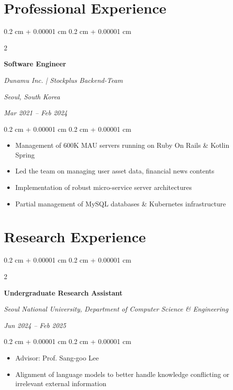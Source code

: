 \documentclass[10pt, letterpaper]{article}
\newenvironment{highlights}{
    \begin{itemize}[
        topsep=0.10 cm,
        parsep=0.10 cm,
        partopsep=0pt,
        itemsep=0pt,
        leftmargin=0.4 cm + 10pt
    ]
}{
    \end{itemize}
} %
\newenvironment{onecolentry}{
    \begin{adjustwidth}{
        0.2 cm + 0.00001 cm
    }{
        0.2 cm + 0.00001 cm
    }
}{
    \end{adjustwidth}
} %
\newenvironment{twocolentry}[2][]{
    \onecolentry
    \def\secondColumn{#2}
    \setcolumnwidth{\fill, 4.5 cm}
    \begin{paracol}{2}
}{
    \switchcolumn \raggedleft \secondColumn
    \end{paracol}
    \endonecolentry
} %
\begin{document}
    
    \section{Professional Experience}

        \begin{twocolentry}{
        \textit{Seoul, South Korea}    
            
        \textit{Mar 2021 – Feb 2024}}
            \textbf{Software Engineer}
            
            \textit{Dunamu Inc. | Stockplus Backend-Team}
        \end{twocolentry}

        \vspace{0.10 cm}
        \begin{onecolentry}
            \begin{highlights}
                \item Management of 600K MAU servers running on Ruby On Rails \& Kotlin Spring
                \item Led the team on managing user asset data, financial news contents
                \item Implementation of robust micro-service server architectures
                \item Partial management of MySQL databases \& Kubernetes infrastructure
            \end{highlights}
        \end{onecolentry}


    \section{Research Experience}

        \begin{twocolentry}{
            
        \textit{Jun 2024 – Feb 2025}}
            \textbf{Undergraduate Research Assistant}

            \textit{Seoul National University,  Department of Computer Science \& Engineering}
        \end{twocolentry}

        \vspace{0.10 cm}
        \begin{onecolentry}
            \begin{highlights}
                \item Advisor: Prof. Sang-goo Lee
                \item Alignment of language models to better handle knowledge conflicting or irrelevant external information
            \end{highlights}
        \end{onecolentry}
\end{document}
